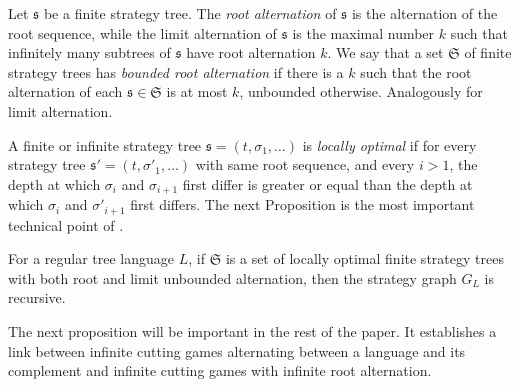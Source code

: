 Let $\mathfrak{s}$ be a finite strategy tree. The \emph{root alternation} of $\mathfrak{s}$ is the alternation of the root sequence, while the limit alternation of $\mathfrak{s}$ is the maximal number $k$ such that infinitely many subtrees of $\mathfrak{s}$ have root alternation $k$. We say that a set  $\mathfrak{S}$ of finite strategy trees has \emph{bounded root alternation} if there is a  $k$ such that the root alternation of each $\mathfrak{s} \in \mathfrak{S}$ is at most $k$, unbounded otherwise. Analogously for limit alternation.

A finite or infinite strategy tree $\mathfrak{s}=(t, \sigma_1, \dots)$ is \emph{locally optimal} if for every strategy tree $\mathfrak{s}'=(t, \sigma'_1, \dots)$ with same root sequence, and every $i>1$, the depth at which $\sigma_i$ and $\sigma_{i+1}$ first differ is greater or equal than the depth at which $\sigma_i$ and $\sigma'_{i+1}$ first differs.
The next Proposition is the most important technical point of \cite{bp}. 



\begin{proposition}[\cite{bp}]\label{prop:locality}
 For a regular tree language $L$, if $\mathfrak{S}$ is a set of locally optimal finite strategy trees with both root and limit unbounded alternation, then the strategy graph $G_L$ is recursive.
 \end{proposition}
 
The next proposition will be important in the rest of the paper. It establishes a link between infinite cutting games alternating between a language and its complement and infinite cutting games with infinite root alternation.

